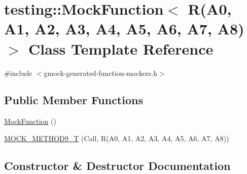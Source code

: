 \hypertarget{classtesting_1_1MockFunction_3_01R_07A0_00_01A1_00_01A2_00_01A3_00_01A4_00_01A5_00_01A6_00_01A7_00_01A8_08_4}{}\section{testing\+::Mock\+Function$<$ R(A0, A1, A2, A3, A4, A5, A6, A7, A8)$>$ Class Template Reference}
\label{classtesting_1_1MockFunction_3_01R_07A0_00_01A1_00_01A2_00_01A3_00_01A4_00_01A5_00_01A6_00_01A7_00_01A8_08_4}


{\ttfamily \#include $<$gmock-\/generated-\/function-\/mockers.\+h$>$}

\subsection*{Public Member Functions}
\begin{DoxyCompactItemize}
\item 
\mbox{\hyperlink{classtesting_1_1MockFunction_3_01R_07A0_00_01A1_00_01A2_00_01A3_00_01A4_00_01A5_00_01A6_00_01A7_00_01A8_08_4_a67f9fca4cf71a5811add15da604a6bbf}{Mock\+Function}} ()
\item 
\mbox{\hyperlink{classtesting_1_1MockFunction_3_01R_07A0_00_01A1_00_01A2_00_01A3_00_01A4_00_01A5_00_01A6_00_01A7_00_01A8_08_4_a0fee6ada67063cc8ec8b2181021f0195}{M\+O\+C\+K\+\_\+\+M\+E\+T\+H\+O\+D9\+\_\+T}} (Call, R(A0, A1, A2, A3, A4, A5, A6, A7, A8))
\end{DoxyCompactItemize}


\subsection{Constructor \& Destructor Documentation}
\mbox{\label{classtesting_1_1MockFunction_3_01R_07A0_00_01A1_00_01A2_00_01A3_00_01A4_00_01A5_00_01A6_00_01A7_00_01A8_08_4_a67f9fca4cf71a5811add15da604a6bbf}} 
